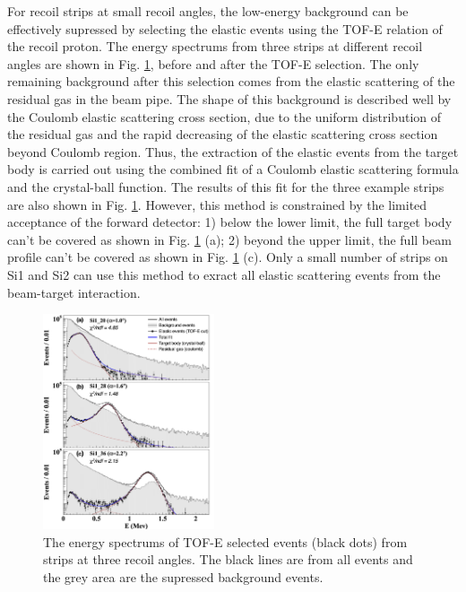 \documentclass[fleqn,twocolumn,a4paper]{ikpar}
\begin{document}
For recoil strips at small recoil angles, the low-energy background can be effectively supressed by selecting the elastic
events using the TOF-E relation of the recoil proton.
The energy spectrums from three strips at different recoil angles are shown in
Fig. \ref{fig:coulomb_cb2_fit},  before and after the TOF-E selection.
The only remaining background after this selection comes from the elastic scattering of the residual gas in the beam pipe.
The shape of this background is described well by the Coulomb elastic scattering cross
section, due to the uniform distribution of the residual gas and the rapid decreasing of
the elastic scattering cross section beyond Coulomb region.
Thus, the extraction of the elastic events from the target body is carried out
using the combined fit of a Coulomb elastic scattering formula and the crystal-ball
function.
The results of this fit for the three example strips are also shown in Fig. \ref{fig:coulomb_cb2_fit}.
However, this method is constrained by the limited acceptance of the forward detector:
1) below the lower limit, the full target body can't be covered as shown in Fig.
\ref{fig:coulomb_cb2_fit} (a);
2) beyond the upper limit, the full beam profile can't be covered as shown in
Fig. \ref{fig:coulomb_cb2_fit} (c).
Only a small number of strips on Si1 and Si2 can use this method to exract all
elastic scattering events from the beam-target interaction.
\begin{figure}[!htb]
	\includegraphics[width=0.45\textwidth]{./coulomb_cb2_fit.png}
  \caption{The energy spectrums of TOF-E selected events (black dots) from strips at three
    recoil angles. The black lines are from all events and the grey area are the
  supressed background events. }
  \label{fig:coulomb_cb2_fit}
\end{figure}
\end{document}
